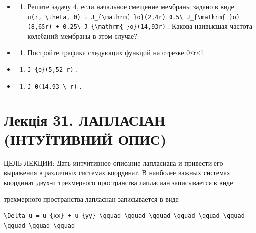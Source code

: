 \documentclass[
  ukrainian,
]{article}
\providecommand{\tightlist}{%
  \setlength{\itemsep}{0pt}\setlength{\parskip}{0pt}}
\begin{document}
\begin{itemize}
\tightlist
\item
  \begin{enumerate}
  \def\labelenumi{\arabic{enumi}.}
  \setcounter{enumi}{4}
  \tightlist
  \item
    Решите задачу 4, если начальное смещение мембраны задано в виде
    \texttt{u(r,\ \textbackslash{}theta,\ 0)\ =\ J\_\{\textbackslash{}mathrm\{\ \}o\}(2,4r)\ 0.5\textbackslash{}\ J\_\{\textbackslash{}mathrm\{\ \}o\}(8,65r)\ +\ 0.25\textbackslash{}\ J\_\{\textbackslash{}mathrm\{\ \}o\}(14,93r)}
    . Какова наивысшая частота колебаний мембраны в этом случае?
  \end{enumerate}
\item
  \begin{enumerate}
  \def\labelenumi{\arabic{enumi}.}
  \setcounter{enumi}{5}
  \tightlist
  \item
    Постройте графики следующих функций на отрезке 0≤r≤1
  \end{enumerate}
\item
  \begin{enumerate}
  \def\labelenumi{\alph{enumi})}
  \tightlist
  \item
    \texttt{J\_\{o\}(5,52\ r)} ,
  \end{enumerate}
\item
  \begin{enumerate}
  \def\labelenumi{\arabic{enumi})}
  \setcounter{enumi}{5}
  \tightlist
  \item
    \texttt{J\_0(14,93\ \textbackslash{}\ r)} .
  \end{enumerate}
\end{itemize}

\section{Лекція 31. ЛАПЛАСІАН (ІНТУЇТИВНИЙ
ОПИС)}\label{ux43bux435ux43aux446ux456ux44f-31.-ux43bux430ux43fux43bux430ux441ux456ux430ux43d-ux456ux43dux442ux443ux457ux442ux438ux432ux43dux438ux439-ux43eux43fux438ux441}

ЦЕЛЬ ЛЕКЦИИ: Дать интуитивное описание лапласиана и привести его
выражения в различных системах координат. В наиболее важных системах
координат двух-и трехмерного пространства лапласиан записывается в виде

трехмерного пространства лапласнан записывается в виде

\begin{verbatim}
\Delta u = u_{xx} + u_{yy} \qquad \qquad \qquad \qquad \qquad \qquad \qquad \qquad \qquad
\end{verbatim}
\end{document}
